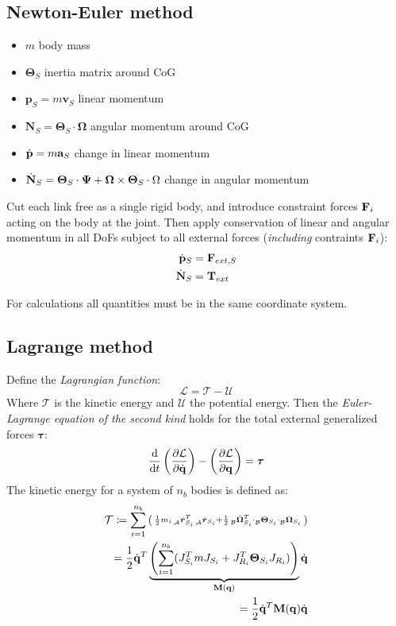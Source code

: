 \documentclass[a4paper, 8pt]{extarticle}
\newcommand{\mvec}[3]{  \prescript{}{\mathcal{#1}}{\bm{#2}}  _{#3} }
\newcommand{\mdvec}[3]{ \prescript{}{\mathcal{#1}}{\dot{\bm #2}} _{#3} }
\begin{document}
\begin{multicols*}{3}
\subsection{Newton-Euler method}
\begin{itemize}
\item $m$ body mass
\item $\bm\Theta_S$ inertia matrix around CoG
\item $\mathbf p_S = m \mathbf v_S$ linear momentum
\item $\mathbf N_S = \bm\Theta_S\cdot \bm\Omega$ angular momentum around CoG
\item $\dot{\bf p} = m {\bf a}_S$ change in linear momentum
\item $\dot{\bf N}_S = \bm\Theta_S \cdot \bm\Psi + \bm\Omega \times \bm\Theta_S \cdot \Omega$ change in angular momentum
\end{itemize}
\vspace{0.5em}
\noindent Cut each link free as a single rigid body, and introduce constraint forces ${\bf F}_i$ acting on the body at the joint. Then apply conservation of linear and angular momentum in all DoFs subject to all external forces (\textit{including} contraints ${\bf F}_i$):
\begin{align*}
\dot{\bf p}_S &= {\bf F}_{ext,S}\\
\dot{\bf N}_S &= {\bf T}_{ext}
\end{align*}

For calculations all quantities must be in the same coordinate system. 



\subsection{Lagrange method}
Define the \emph{Lagrangian function}:
$$\mathcal L = \mathcal T - \mathcal U$$
Where $\mathcal T$ is the kinetic energy and $\mathcal U$ the potential energy. Then the \emph{Euler-Lagrange equation of the second kind} holds for the total external generalized forces $\bm\tau$:
$$\frac{\text d}{\text dt} \left( \frac{\partial\mathcal L}{\partial \dot{\bf q}} \right) - \left( \frac{\partial\mathcal L}{\partial \bf q} \right) = \bm\tau$$
The kinetic energy for a system of $n_b$ bodies is defined as:
\begin{align*}
\mathcal T \coloneqq \sum_{i=1}^{n_b}\left(\begin{smallmatrix} \frac 12 m_i \mdvec{A}{r}{S_i}^T \mdvec{A}{r}{S_i} + \frac 12 \mdvec{B}{\Omega}{S_i}^T \cdot \mvec{B}{\Theta}{S_i} \cdot \mvec{B}{\Omega}{S_i} \end{smallmatrix} \right) \\
= \frac 12 \dot{\bf q}^T \underbrace{ \left(  \sum_{i=1}^{n_b} (J^T_{S_i}mJ_{S_i} + J^T_{R_i} \bm\Theta_{S_i} J_{R_i})  \right) }_{\bf M(q)} \dot{\bf q} \\
= \frac 12 \dot{\bf q}^T {\bf M(q)} \dot{\bf q}
\end{align*}


\end{multicols*}
\end{document}
